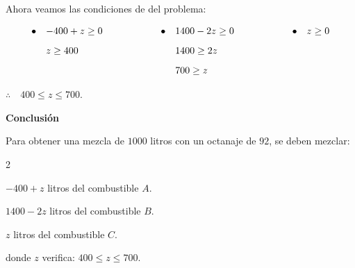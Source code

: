 \documentclass[11pt]{article}
\begin{document}
\begin{enumerate}[\hspace{-7mm} 1) ]
\medskip


Ahora veamos las condiciones de del problema:

\[
\begin{array}{rl @{\qquad\qquad \qquad} rl @{\qquad\qquad\qquad}  rl }
\bullet & -400+z\geq 0 
&
\bullet &  1400 -2z\geq 0 
&
\bullet &  z\geq 0  
\\[3mm]
   &  z\geq 400
   &
   &   1400 \geq 2z
   &
   &  
\\[3mm]
   &    &
   &   700 \geq z
   &   &  
\end{array}
\]

\hfill$\therefore\quad 400 \leq z \leq  700$.\ 

\textbf{Conclusión}

Para obtener una mezcla de $1000$ litros con un octanaje de $92$, se deben mezclar:
\begin{itemize}
\begin{multicols}{2}
    \item $ -400+z$ litros del combustible $A$.
    \item $ 1400 -2z$ litros del combustible $B$.
    \item $z$ litros del combustible $C$.  
    \item donde $z$ verifica: \quad $ 400 \leq z \leq 700$.
\end{multicols}
\end{itemize}











\end{enumerate}
\end{document}
